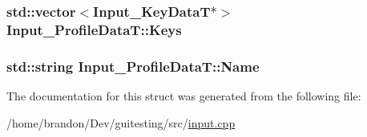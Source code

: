 \hypertarget{struct_input___profile_data_t_d8c4669979c3a47f8bb1dbe58289fb87}{
\subsubsection[{Keys}]{\setlength{\rightskip}{0pt plus 5cm}std::vector$<${\bf Input\_\-KeyDataT}$\ast$$>$ {\bf Input\_\-ProfileDataT::Keys}}}
\label{struct_input___profile_data_t_d8c4669979c3a47f8bb1dbe58289fb87}


\hypertarget{struct_input___profile_data_t_6732c71f6a7bed7d41854c1371de4acc}{
\subsubsection[{Name}]{\setlength{\rightskip}{0pt plus 5cm}std::string {\bf Input\_\-ProfileDataT::Name}}}
\label{struct_input___profile_data_t_6732c71f6a7bed7d41854c1371de4acc}




The documentation for this struct was generated from the following file:\begin{CompactItemize}
\item 
/home/brandon/Dev/guitesting/src/\hyperlink{input_8cpp}{input.cpp}\end{CompactItemize}

